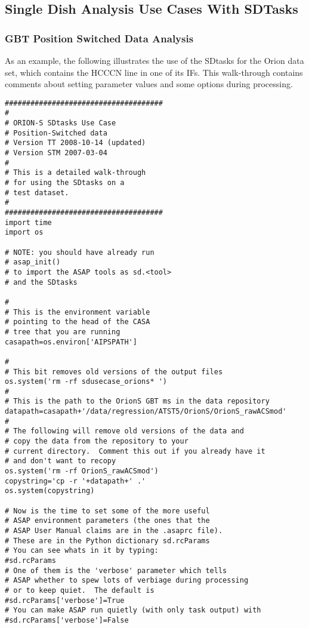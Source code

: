 \subsection{Single Dish Analysis Use Cases With SDTasks}
\label{section:sd.sdtasks.usecase}

\subsubsection{GBT Position Switched Data Analysis}
As an example, the following illustrates the use of the SDtasks for
the Orion data set, which contains the HCCCN line in one of its IFs.
This walk-through contains comments about setting parameter values
and some options during processing.

\begin{verbatim}
#####################################
#
# ORION-S SDtasks Use Case
# Position-Switched data
# Version TT 2008-10-14 (updated)
# Version STM 2007-03-04
#
# This is a detailed walk-through
# for using the SDtasks on a
# test dataset.
#
#####################################
import time
import os

# NOTE: you should have already run
# asap_init()
# to import the ASAP tools as sd.<tool>
# and the SDtasks

#
# This is the environment variable
# pointing to the head of the CASA
# tree that you are running
casapath=os.environ['AIPSPATH']

#
# This bit removes old versions of the output files
os.system('rm -rf sdusecase_orions* ')
#
# This is the path to the OrionS GBT ms in the data repository
datapath=casapath+'/data/regression/ATST5/OrionS/OrionS_rawACSmod'
#
# The following will remove old versions of the data and
# copy the data from the repository to your
# current directory.  Comment this out if you already have it
# and don't want to recopy
os.system('rm -rf OrionS_rawACSmod')
copystring='cp -r '+datapath+' .'
os.system(copystring)

# Now is the time to set some of the more useful
# ASAP environment parameters (the ones that the
# ASAP User Manual claims are in the .asaprc file).
# These are in the Python dictionary sd.rcParams
# You can see whats in it by typing:
#sd.rcParams
# One of them is the 'verbose' parameter which tells
# ASAP whether to spew lots of verbiage during processing
# or to keep quiet.  The default is
#sd.rcParams['verbose']=True
# You can make ASAP run quietly (with only task output) with
#sd.rcParams['verbose']=False


\end{verbatim}
